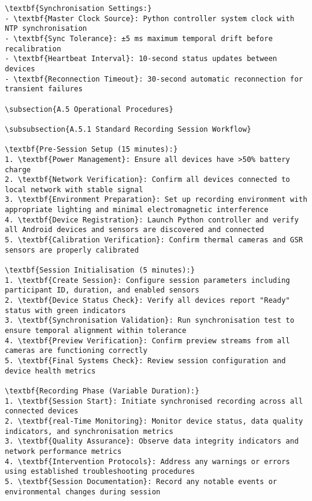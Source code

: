 \begin{verbatim}
\textbf{Synchronisation Settings:}
- \textbf{Master Clock Source}: Python controller system clock with NTP synchronisation
- \textbf{Sync Tolerance}: ±5 ms maximum temporal drift before recalibration
- \textbf{Heartbeat Interval}: 10-second status updates between devices
- \textbf{Reconnection Timeout}: 30-second automatic reconnection for transient failures

\subsection{A.5 Operational Procedures}

\subsubsection{A.5.1 Standard Recording Session Workflow}

\textbf{Pre-Session Setup (15 minutes):}
1. \textbf{Power Management}: Ensure all devices have >50% battery charge
2. \textbf{Network Verification}: Confirm all devices connected to local network with stable signal
3. \textbf{Environment Preparation}: Set up recording environment with appropriate lighting and minimal electromagnetic interference
4. \textbf{Device Registration}: Launch Python controller and verify all Android devices and sensors are discovered and connected
5. \textbf{Calibration Verification}: Confirm thermal cameras and GSR sensors are properly calibrated

\textbf{Session Initialisation (5 minutes):}
1. \textbf{Create Session}: Configure session parameters including participant ID, duration, and enabled sensors
2. \textbf{Device Status Check}: Verify all devices report "Ready" status with green indicators
3. \textbf{Synchronisation Validation}: Run synchronisation test to ensure temporal alignment within tolerance
4. \textbf{Preview Verification}: Confirm preview streams from all cameras are functioning correctly
5. \textbf{Final Systems Check}: Review session configuration and device health metrics

\textbf{Recording Phase (Variable Duration):}
1. \textbf{Session Start}: Initiate synchronised recording across all connected devices
2. \textbf{real-Time Monitoring}: Monitor device status, data quality indicators, and synchronisation metrics
3. \textbf{Quality Assurance}: Observe data integrity indicators and network performance metrics
4. \textbf{Intervention Protocols}: Address any warnings or errors using established troubleshooting procedures
5. \textbf{Session Documentation}: Record any notable events or environmental changes during session


\end{verbatim}
